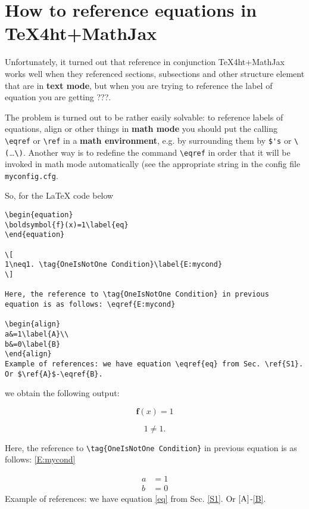 \documentclass{article}
\begin{document}
\section{How to reference equations in TeX4ht+MathJax}\label{S2}
Unfortunately, it turned out that reference in conjunction TeX4ht+MathJax
works well when they referenced sections, subsections and other structure
element that are in \textbf{text mode}, but when you are trying to reference
the label of equation you are getting ???.

The problem is turned out to be rather easily solvable: to reference labels
of equations, align or other things in \textbf{math mode} you should put the
calling \verb|\eqref| or \verb|\ref| in a \textbf{math environment}, e.g. by
surrounding them by \verb|$'s| or \verb|\(|\ldots\verb|\)|. Another way is to
redefine the command \verb|\eqref| in order that it will be invoked in math
mode automatically (see the appropriate string in the config file
\verb|myconfig.cfg|.

So, for the \LaTeX{} code below
  {\small
    \begin{verbatim}
\begin{equation}
\boldsymbol{f}(x)=1\label{eq}
\end{equation}

\[
1\neq1. \tag{OneIsNotOne Condition}\label{E:mycond}
\]

Here, the reference to \tag{OneIsNotOne Condition} in previous
equation is as follows: \eqref{E:mycond}

\begin{align}
a&=1\label{A}\\
b&=0\label{B}
\end{align}
Example of references: we have equation \eqref{eq} from Sec. \ref{S1}. Or $\ref{A}$-\eqref{B}.
\end{verbatim}}
\noindent we obtain the following output:

\begin{equation}
  \boldsymbol{f}(x)=1\label{eq}
\end{equation}

\[
  1\neq1. \tag{OneIsNotOne Condition}\label{E:mycond}
\]

Here, the reference to \verb|\tag{OneIsNotOne Condition}| in previous
equation is as follows: \eqref{E:mycond}

\begin{align}
  a & =1\label{A} \\
  b & =0\label{B}
\end{align}
Example of references: we have equation \eqref{eq} from Sec. \ref{S1}. Or
$\ref{A}$-\eqref{B}.
\end{document}
